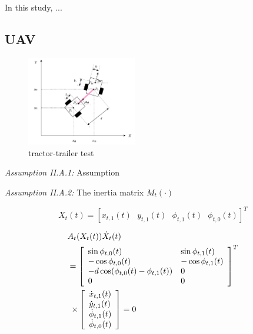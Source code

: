 \documentclass{ieeeaccess}%
\begin{document}
In this study, ...

\subsection{UAV}

\begin{figure}[htbp]
\centering
\includegraphics[width=0.43\textwidth]{tractor-trailer.pdf}
\caption{tractor-trailer test}%
\label{fig:tractor-trailer}%
\end{figure}

\textit{Assumption II.A.1:} Assumption

\textit{Assumption II.A.2:} The inertia matrix $M_{t}(\cdot)$ 

\begin{equation}
X_{t}(t)=[x_{t,1}(t)\text{ }y_{t,1}(t)\text{ }\phi_{t,1}(t)\text{ }\phi
_{t,0}(t)]^{T}
\label{tt state-space x}
\end{equation}

\begin{align}
&  A_{t}(X_{t}(t))\dot{X}_{t}(t)\label{tt constraint Adx=0}\\
&  =\left[
\begin{array}
[c]{ll}%
\sin\phi_{t,0}(t) & \sin\phi_{t,1}(t)\\
-\cos\phi_{t,0}(t) & -\cos\phi_{t,1}(t)\\
-d\cos(\phi_{t,0}(t)-\phi_{t,1}(t)) & 0\\
0 & 0
\end{array}
\right]  ^{T}\nonumber\\
&
\begin{array}
[c]{l}%
\times\left[
\begin{array}
[c]{l}%
\dot{x}_{t,1}(t)\\
\dot{y}_{t,1}(t)\\
\dot{\phi}_{t,1}(t)\\
\dot{\phi}_{t,0}(t)
\end{array}
\right]  =0
\end{array}
\nonumber
\end{align}
\end{document}

